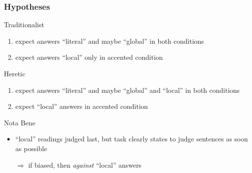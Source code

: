 \documentclass[fleqn,10pt,serif,xcolor=dvipsnames]{beamer}
\begin{document}
\begin{frame}
  \frametitle{Hypotheses}

  \begin{block}{Traditionalist}
    \begin{enumerate}
    \item expect answers ``literal'' and maybe ``global'' in both conditions
    \item expect answers ``local'' only in accented condition
    \end{enumerate}
  \end{block}

  \begin{block}{Heretic}
    \begin{enumerate}
    \item expect answers ``literal'' and maybe ``global'' and
      ``local'' in both conditions
    \item expect ``local'' answers in accented condition
    \end{enumerate}
  \end{block}

  \begin{block}{Nota Bene}
    \begin{itemize}
    \item ``local'' readings judged last, but task clearly states to
      judge sentences as soon as possible
    \item[$\Rightarrow$] if biased, then \emph{against} ``local'' answers
    \end{itemize}
  \end{block}

\end{frame}
\end{document}
